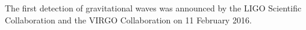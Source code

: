 The first detection of gravitational waves was announced by the LIGO
Scientific Collaboration and the VIRGO Collaboration on 11 February
2016\cite{2016PhRvL.116f1102A}.


